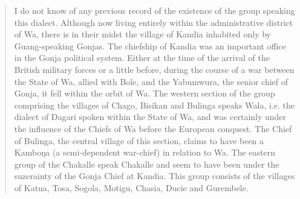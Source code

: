 \begin{quote} I do not know of any previous record of the existence of the 
group speaking this dialect. Although now living entirely within the 
administrative district of Wa, there is in their midst the village of Kandia 
inhabited only by Guang-speaking Gonjas. The chiefship of Kandia was an 
important office in the Gonja political system. Either at the time of the 
arrival of the British military forces or a little before, during the course of 
a war between the State of Wa, allied with Bole, and the Yabumwura, the senior 
chief of Gonja, it fell within the orbit of Wa. The western section of the 
group 
comprising the villages of Chago, Bisikan and Bulinga speaks Wala, i.e. the 
dialect of Dagari spoken within the State of Wa, and was certainly under the 
influence of the Chiefs of Wa before the European conquest. The Chief of 
Bulinga, the central village of this section, claims to have been a Kamboŋa (a 
semi-dependent war-chief) in relation to Wa. The eastern group of the Chakalle 
speak Chakalle and seem to have been under the suzerainty of the Gonja Chief at 
Kandia. This group consists of the villages of Katua, Tosa, Sogola, Motigu, 
Chasia, Ducie and Gurembele. \citep[3]{Good54} 
\end{quote}

